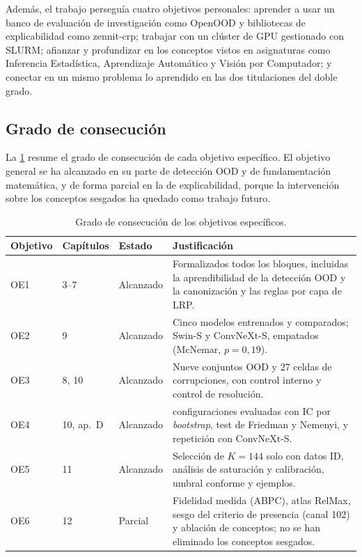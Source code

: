 Además, el trabajo perseguía cuatro objetivos personales: aprender a usar un banco de evaluación de investigación como OpenOOD y bibliotecas de explicabilidad como zennit-crp; trabajar con un clúster de GPU gestionado con SLURM; afianzar y profundizar en los conceptos vistos en asignaturas como Inferencia Estadística, Aprendizaje Automático y Visión por Computador; y conectar en un mismo problema lo aprendido en las dos titulaciones del doble grado.

\subsection{Grado de consecución}\label{sec:consecucion}

La \cref{tab:consecucion} resume el grado de consecución de cada objetivo específico. El objetivo general se ha alcanzado en su parte de detección OOD y de fundamentación matemática, y de forma parcial en la de explicabilidad, porque la intervención sobre los conceptos sesgados ha quedado como trabajo futuro.

\begin{table}[tbp]
  \centering
  \footnotesize
  \caption{Grado de consecución de los objetivos específicos.}
  \label{tab:consecucion}
  \begin{tabularx}{\textwidth}{@{}l l l >{\raggedright\arraybackslash}X@{}}
    \toprule
    \textbf{Objetivo} & \textbf{Capítulos} & \textbf{Estado} & \textbf{Justificación} \\
    \midrule
    OE1 & 3--7 & Alcanzado & Formalizados todos los bloques, incluidas la aprendibilidad de la detección OOD y la canonización y las reglas por capa de LRP. \\
    OE2 & 9 & Alcanzado & Cinco modelos entrenados y comparados; Swin-S y ConvNeXt-S, empatados (McNemar, $p = 0{,}19$). \\
    OE3 & 8, 10 & Alcanzado & Nueve conjuntos OOD y 27 celdas de corrupciones, con control interno y control de resolución. \\
    OE4 & 10, ap.~D & Alcanzado & 17 configuraciones evaluadas con IC por \emph{bootstrap}, test de Friedman y Nemenyi, y repetición con ConvNeXt-S. \\
    OE5 & 11 & Alcanzado & Selección de $K = 144$ solo con datos ID, análisis de saturación y calibración, umbral conforme y ejemplos. \\
    OE6 & 12 & Parcial & Fidelidad medida (ABPC), atlas RelMax, sesgo del criterio de presencia (canal 102) y ablación de conceptos; no se han eliminado los conceptos sesgados. \\
    \bottomrule
  \end{tabularx}
\end{table}

